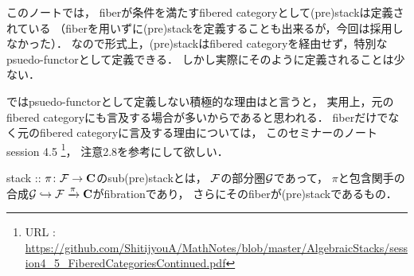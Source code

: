 \documentclass[a4paper]{jsarticle}
\begin{document}
\begin{Remark}
    このノートでは，
    fiberが条件を満たすfibered categoryとして(pre)stackは定義されている
    （fiberを用いずに(pre)stackを定義することも出来るが，今回は採用しなかった）．
    なので形式上，(pre)stackはfibered categoryを経由せず，特別なpsuedo-functorとして定義できる．
    しかし実際にそのように定義されることは少ない．

    ではpsuedo-functorとして定義しない積極的な理由はと言うと，
    実用上，元のfibered categoryにも言及する場合が多いからであると思われる．
    fiberだけでなく元のfibered categoryに言及する理由については，
    このセミナーのノート session 4.5
    \footnote{URL : \url{https://github.com/ShitijyouA/MathNotes/blob/master/AlgebraicStacks/session4_5_FiberedCategoriesContinued.pdf}}，
    注意2.8を参考にして欲しい．
\end{Remark}

\begin{Def}
    stack :: $\pi \colon \mathcal{F} \to \mathbf{C}$のsub(pre)stackとは，
    $\mathcal{F}$の部分圏$\mathcal{G}$であって，
    $\pi$と包含関手の合成$\mathcal{G} \hookrightarrow \mathcal{F} \xrightarrow{\pi} \mathbf{C}$がfibrationであり，
    さらにそのfiberが(pre)stackであるもの．
\end{Def}
\end{document}
